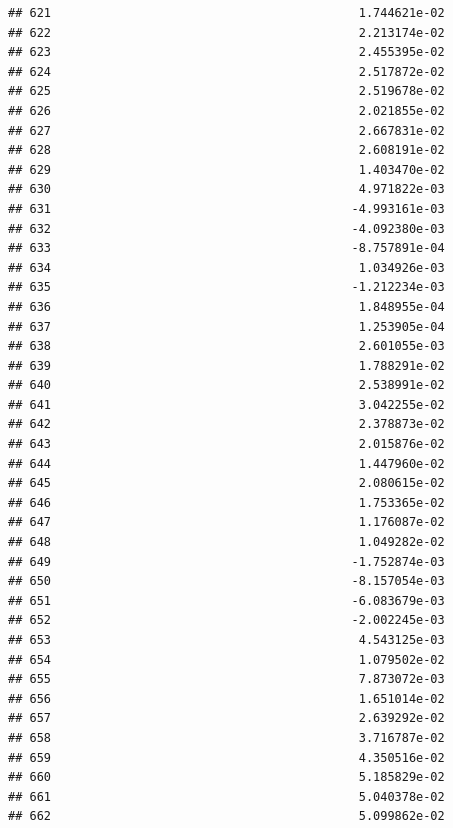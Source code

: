 \documentclass[
]{article}
\begin{document}
\begin{verbatim}
## 621                                           1.744621e-02
## 622                                           2.213174e-02
## 623                                           2.455395e-02
## 624                                           2.517872e-02
## 625                                           2.519678e-02
## 626                                           2.021855e-02
## 627                                           2.667831e-02
## 628                                           2.608191e-02
## 629                                           1.403470e-02
## 630                                           4.971822e-03
## 631                                          -4.993161e-03
## 632                                          -4.092380e-03
## 633                                          -8.757891e-04
## 634                                           1.034926e-03
## 635                                          -1.212234e-03
## 636                                           1.848955e-04
## 637                                           1.253905e-04
## 638                                           2.601055e-03
## 639                                           1.788291e-02
## 640                                           2.538991e-02
## 641                                           3.042255e-02
## 642                                           2.378873e-02
## 643                                           2.015876e-02
## 644                                           1.447960e-02
## 645                                           2.080615e-02
## 646                                           1.753365e-02
## 647                                           1.176087e-02
## 648                                           1.049282e-02
## 649                                          -1.752874e-03
## 650                                          -8.157054e-03
## 651                                          -6.083679e-03
## 652                                          -2.002245e-03
## 653                                           4.543125e-03
## 654                                           1.079502e-02
## 655                                           7.873072e-03
## 656                                           1.651014e-02
## 657                                           2.639292e-02
## 658                                           3.716787e-02
## 659                                           4.350516e-02
## 660                                           5.185829e-02
## 661                                           5.040378e-02
## 662                                           5.099862e-02

\end{verbatim}
\end{document}
